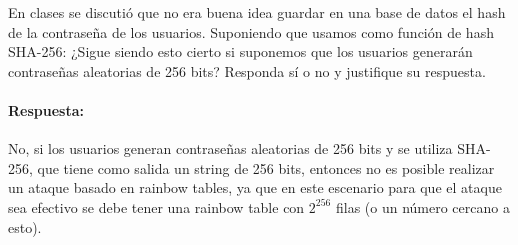 En clases se discutió que no era buena idea guardar en una base de datos el hash de la contraseña de los usuarios. Suponiendo que usamos como función de hash SHA-256: ¿Sigue siendo esto cierto si suponemos que los usuarios generarán contraseñas aleatorias de 256 bits? Responda sí o no y justifique su respuesta.

\paragraph{Respuesta:} No, si los usuarios generan contraseñas aleatorias de 256 bits y se utiliza SHA-256, que tiene como salida un string de 256 bits, entonces no es posible realizar un ataque basado en rainbow tables, ya que en este escenario para que el ataque sea efectivo se debe tener una rainbow table con $2^{256}$ filas (o un número cercano a esto).

